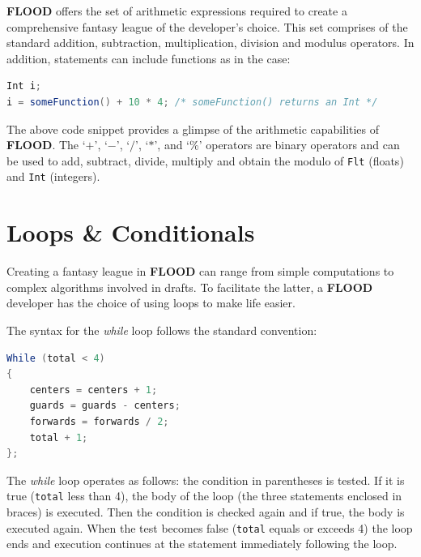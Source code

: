 \documentclass[12pt]{report}
\begin{document}
\textbf{FLOOD} offers the set of arithmetic expressions required to create a comprehensive fantasy league of the developer's choice. This set comprises of the standard addition, subtraction, multiplication, division and modulus operators. In addition, statements can include functions as in the case:

\begin{singlespace}
\begin{lstlisting}[language=Java,label=some-code,caption=Function used in an arithmetic statement]
Int i;
i = someFunction() + 10 * 4; /* someFunction() returns an Int */
\end{lstlisting}
\end{singlespace}

The above code snippet provides a glimpse of the arithmetic capabilities of \textbf{FLOOD}. The `$+$', `$-$', `$/$', `$*$', and `\%' operators are binary operators and can be used to add, subtract, divide, multiply and obtain the modulo of \texttt{Flt} (floats) and \texttt{Int} (integers).

\section{Loops \& Conditionals}

Creating a fantasy league in \textbf{FLOOD} can range from simple computations to complex algorithms involved in drafts. To facilitate the latter, a \textbf{FLOOD} developer has the choice of using loops to make life easier.

The syntax for the \textit{while} loop follows the standard convention:

\begin{singlespace}
\begin{lstlisting}[language=Java,label=some-code,caption=while loop]
While (total < 4)
{
	centers = centers + 1;
	guards = guards - centers;
	forwards = forwards / 2;
	total + 1;
};
\end{lstlisting}
\end{singlespace}

The \textit{while} loop operates as follows: the condition in parentheses is tested. If it is true (\texttt{total} less than 4), the body of the loop (the three statements enclosed in braces) is executed. Then the condition is checked again and if true, the body is executed again. When the test becomes false (\texttt{total} equals or exceeds 4) the loop ends and execution continues at the statement immediately following the loop. 
\end{document}
